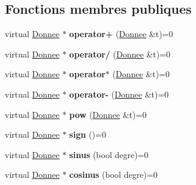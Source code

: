 \subsection*{Fonctions membres publiques}
\begin{DoxyCompactItemize}
\item 
\hypertarget{class_constante_a914d72396ac8ee3c9a59fd6d4817feb4}{virtual \hyperlink{class_donnee}{Donnee} $\ast$ {\bfseries operator+} (\hyperlink{class_donnee}{Donnee} \&t)=0}\label{class_constante_a914d72396ac8ee3c9a59fd6d4817feb4}

\item 
\hypertarget{class_constante_ac4772c2a34869f1da07f174cc3331ae3}{virtual \hyperlink{class_donnee}{Donnee} $\ast$ {\bfseries operator/} (\hyperlink{class_donnee}{Donnee} \&t)=0}\label{class_constante_ac4772c2a34869f1da07f174cc3331ae3}

\item 
\hypertarget{class_constante_a0b06eab8cf8a92715348476b74b30f84}{virtual \hyperlink{class_donnee}{Donnee} $\ast$ {\bfseries operator$\ast$} (\hyperlink{class_donnee}{Donnee} \&t)=0}\label{class_constante_a0b06eab8cf8a92715348476b74b30f84}

\item 
\hypertarget{class_constante_a5ecc23da0dc7eb89e02896a22029f222}{virtual \hyperlink{class_donnee}{Donnee} $\ast$ {\bfseries operator-\/} (\hyperlink{class_donnee}{Donnee} \&t)=0}\label{class_constante_a5ecc23da0dc7eb89e02896a22029f222}

\item 
\hypertarget{class_constante_a6f94123b249adbb3f839688b1fa90908}{virtual \hyperlink{class_donnee}{Donnee} $\ast$ {\bfseries pow} (\hyperlink{class_donnee}{Donnee} \&t)=0}\label{class_constante_a6f94123b249adbb3f839688b1fa90908}

\item 
\hypertarget{class_constante_a77547d8149c75a147c20a575463861b4}{virtual \hyperlink{class_donnee}{Donnee} $\ast$ {\bfseries sign} ()=0}\label{class_constante_a77547d8149c75a147c20a575463861b4}

\item 
\hypertarget{class_constante_ae9114c2384356454a895bdc9be526fd1}{virtual \hyperlink{class_donnee}{Donnee} $\ast$ {\bfseries sinus} (bool degre)=0}\label{class_constante_ae9114c2384356454a895bdc9be526fd1}

\item 
\hypertarget{class_constante_a68bbf0a45b4df44285e6061e9ece41cb}{virtual \hyperlink{class_donnee}{Donnee} $\ast$ {\bfseries cosinus} (bool degre)=0}\label{class_constante_a68bbf0a45b4df44285e6061e9ece41cb}


\end{DoxyCompactItemize}
